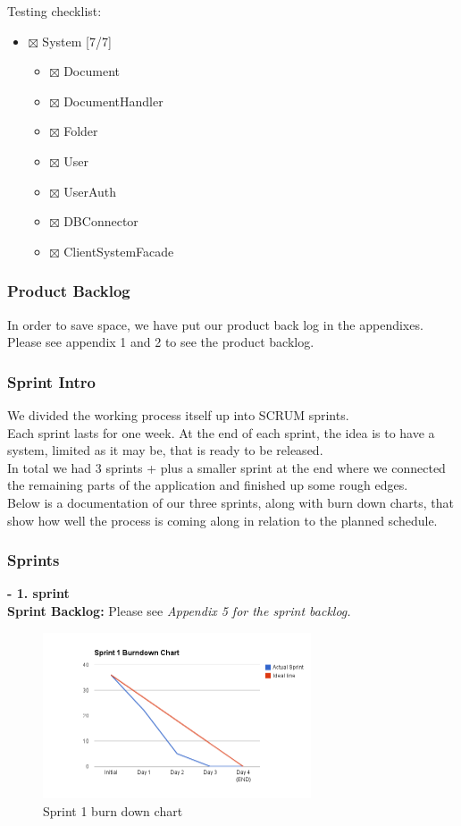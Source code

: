 \documentclass[11pt]{article}
\begin{document}
Testing checklist:
\begin{itemize}
\item $\boxtimes$ System [7/7]
\begin{itemize}
\item $\boxtimes$ Document
\item $\boxtimes$ DocumentHandler
\item $\boxtimes$ Folder
\item $\boxtimes$ User
\item $\boxtimes$ UserAuth
\item $\boxtimes$ DBConnector
\item $\boxtimes$ ClientSystemFacade
\end{itemize}
\end{itemize}

\subsubsection{Product Backlog}
\label{sec-5-1-2}
In order to save space, we have put our product back log in the appendixes. Please see appendix 1 and 2 to see the product backlog.
\subsubsection{Sprint Intro}
\label{sec-5-1-3}
We divided the working process itself up into SCRUM sprints. \\
Each sprint lasts for one week. At the end of  each sprint, the idea is to have a system, limited as it may be, that is ready to be released. \\
In total we had 3 sprints + plus a smaller sprint at the end where we connected the remaining parts of the application and finished up some rough edges. \\
Below is a documentation of our three sprints, along with burn down charts, that show how well the process is coming along in relation to the planned schedule.
\subsubsection{Sprints}
\label{sec-5-1-4}

\textbf{- 1. sprint} \\
\textbf{Sprint Backlog:} Please see \emph{Appendix 5 for the sprint backlog.}

\begin{figure}[H]
  		\centering
    	\includegraphics[width=300px]{images/SCRUM/Sprint 1 burndown chart.png}
    	\caption{Sprint 1 burn down chart}
\end{figure}
\end{document}
